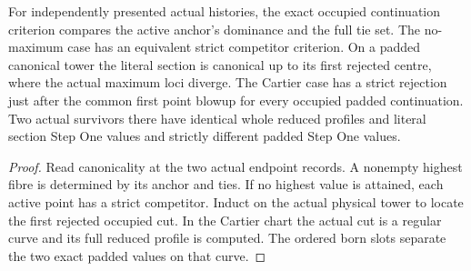 \begin{theorem}
\label{hir:g1-exact-independent-canonical-stop}
\leanok
For independently presented actual histories, the exact
occupied continuation criterion compares the active anchor's
dominance and the full tie set. The no-maximum case has an
equivalent strict competitor criterion. On a padded canonical
tower the literal section is canonical up to its first rejected
centre, where the actual maximum loci diverge. The Cartier
case has a strict rejection just after the common first point
blowup for every occupied padded continuation. Two actual
survivors there have identical whole reduced profiles and
literal section Step One values and strictly different padded
Step One values.
\end{theorem}
\begin{proof}
Read canonicality at the two actual endpoint records. A
nonempty highest fibre is determined by its anchor and ties.
If no highest value is attained, each active point has a
strict competitor. Induct on the actual physical tower to
locate the first rejected occupied cut. In the Cartier chart
the actual cut is a regular curve and its full reduced
profile is computed. The ordered born slots separate the
two exact padded values on that curve.
\end{proof}

